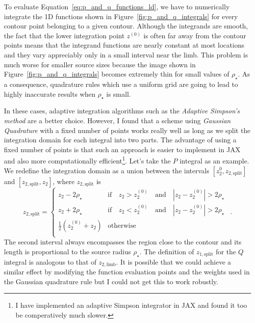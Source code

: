 \documentclass[12pt,dvipsnames]{report}
\newcommand{\ssf}[1]{\textsf{#1}}
\newcommand{\hquad}{~~}
\begin{document}
To evaluate Equation~\ref{eq:p_and_q_functions_ld}, we have to numerically integrate
the 1D functions shown in Figure~\ref{fig:p_and_q_integrals} for every contour point 
belonging to a given contour.
Although the integrands are smooth, the fact that the  lower integration point $z^{(0)}$ is 
often far away from the contour points means that the integrand
functions are nearly constant at most locations and they vary appreciably only in a small
interval near the limb. This problem is much worse for smaller source sizes because the 
image shown in Figure~\ref{fig:p_and_q_integrals} becomes extremely thin for small values 
of $\rho_\star$. As a consequence, quadrature rules which use a uniform grid are going to 
lead to highly inaccurate results when $\rho_\star$ is small.

In these cases, adaptive integration algorithms such as the \emph{Adaptive Simpson's method}
are a better choice. However, I found that a scheme using \emph{Gaussian Quadrature} with a 
fixed number of points works really well as long as we split the integration domain for each 
integral into two parts. 
The advantage of using a fixed number of points is that such an approach is easier to implement 
in \ssf{JAX} and also more computationally efficient\footnote{I have implemented an
adaptive Simpson integrator in \ssf{JAX} and found it too be comperatively much slower.}. 
Let's take the $P$ integral as an example. We redefine the integration domain 
as a union between the intervals $[z_2^{0}, z_{2,\mathrm{split}}]$
and $[z_{2,\mathrm{split}}, z_2]$, where $z_{2, \mathrm{split}}$ is 
\begin{equation}
        z_{2,\mathrm{split}}=
    \begin{cases}
       z_2 - 2\rho_\star & \text{if}\quad z_2> z_2^{(0)} \quad\text{and}\quad |z_2 - z_2^{(0)}|>2\rho_\star\\
       z_2 + 2\rho_\star & \text{if}\quad z_2 < z_2^{(0)} \quad\text{and}\quad |z_2 - z_2^{(0)}|>2\rho_\star\\
       \frac{1}{2}(z_2^{(0)} + z_2) &\text{otherwise}\\
    \end{cases}
    \hquad .
    \label{eq:z_split}
\end{equation}
The second interval always encompasses the region close to the contour and its length 
is proportional to the source radius $\rho_\star$.  The definition of $z_{1,\mathrm{split}}$
for the $Q$ integral is analogous to that of $z_{2, \mathrm{limb}}$.
It is possible that we could achieve a similar effect by modifying the function evaluation 
points and the weights used in the Gaussian quadrature rule but I could not get this to work 
robustly.
\end{document}
